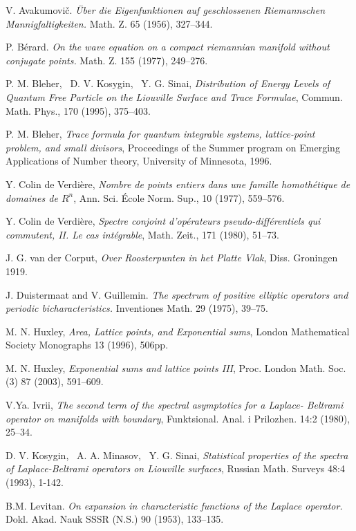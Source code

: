 \documentclass[12pt]{amsart}
\numberwithin{equation}{subsection}
\theoremstyle{definition}
\theoremstyle{plain}
\begin{document}
\begin{thebibliography}{[AHU]}

 V. Avakumovi\v c. {\em \"Uber die Eigenfunktionen auf geschlossenen Riemannschen
Mannigfaltigkeiten.} Math. Z. 65 (1956), 327--344.

 P. B\'erard.  {\em On the wave equation on a
compact riemannian manifold without conjugate points.} Math. Z. 155
(1977), 249--276.

 P. M. Bleher, \ D. V. Kosygin, \ Y. G. Sinai,  {\em{Distribution of Energy Levels of Quantum Free Particle
on the Liouville Surface and Trace Formulae}}, Commun. Math. Phys., 170 (1995), 375--403.

 P. M. Bleher, {\em{Trace formula for quantum integrable systems,
lattice-point problem, and small divisors}}, Proceedings of the Summer program on Emerging Applications
of Number theory, University of Minnesota, 1996.

 Y. Colin de Verdi\`ere,  {\em{Nombre de points entiers dans une famille homoth\'etique
de domaines de $R^n$}}, Ann. Sci. \'Ecole Norm. Sup., 10 (1977), 559--576.

 Y. Colin de Verdi\`ere,  {\em{Spectre conjoint d'op\'erateurs pseudo-diff\'erentiels qui commutent, II. Le cas
int\'egrable}}, Math. Zeit., 171 (1980), 51--73.

 J. G. van der Corput, {\em{Over Roosterpunten in het Platte Vlak}}, Diss. Groningen 1919.

 J. Duistermaat and V. Guillemin.  {\em The
spectrum of positive elliptic operators and periodic
bicharacteristics.}  Inventiones Math.  29 (1975), 39--75.

 M. N. Huxley,  {\em{Area, Lattice points, and Exponential sums}},
London Mathematical Society Monographs 13 (1996), 506pp.

 M. N. Huxley,  {\em{Exponential sums and lattice points III}}, Proc. London Math. Soc. (3) 87 (2003), 591--609.

 V.Ya. Ivrii, {\em{The second term of the spectral asymptotics for a Laplace-
Beltrami operator on manifolds with boundary}}, Funktsional. Anal. i
Prilozhen. 14:2 (1980), 25--34.

 D. V. Kosygin, \ A. A. Minasov, \ Y. G. Sinai,  {\em{Statistical properties of the spectra of Laplace-Beltrami operators on Liouville surfaces}}, Russian Math. Surveys 48:4 (1993), 1-142.

 B.M. Levitan. {\em On expansion in characteristic functions of the Laplace operator.}
Dokl. Akad. Nauk SSSR (N.S.) 90 (1953), 133--135.


\end{thebibliography}
\end{document}
